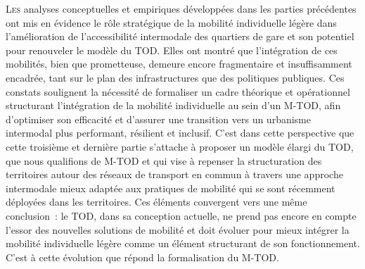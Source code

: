 \lettrine[lines=3, findent=8pt, nindent=0pt]{ L}{es} analyses conceptuelles et empiriques développées dans les parties précédentes ont mis en évidence le rôle stratégique de la mobilité individuelle légère dans l’amélioration de l’accessibilité intermodale des quartiers de gare et son potentiel pour renouveler le modèle du \acrshort{TOD}. Elles ont montré que l’intégration de ces mobilités, bien que prometteuse, demeure encore fragmentaire et insuffisamment encadrée, tant sur le plan des infrastructures que des politiques publiques. Ces constats soulignent la nécessité de formaliser un cadre théorique et opérationnel structurant l’intégration de la mobilité individuelle au sein d'un \acrshort{M-TOD}, afin d’optimiser son efficacité et d’assurer une transition vers un urbanisme intermodal plus performant, résilient et inclusif. C’est dans cette perspective que cette troisième et dernière partie s’attache à proposer un modèle élargi du \acrshort{TOD}, que nous qualifions de \acrfull{M-TOD} et qui vise à repenser la structuration des territoires autour des réseaux de transport en commun à travers une approche intermodale mieux adaptée aux pratiques de mobilité qui se sont récemment déployées dans les territoires. Ces éléments convergent vers une même conclusion~: le \acrshort{TOD}, dans sa conception actuelle, ne prend pas encore en compte l’essor des nouvelles solutions de mobilité et doit évoluer pour mieux intégrer la mobilité individuelle légère comme un élément structurant de son fonctionnement. C’est à cette évolution que répond la formalisation du \acrshort{M-TOD}.

